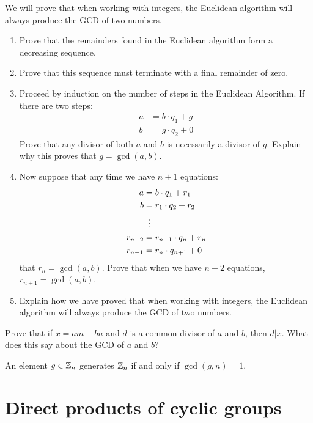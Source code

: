 \documentclass{ximera}
\begin{document}
\begin{exercise} 
We will prove that when working with integers, the Euclidean algorithm
will always produce the GCD of two numbers.
\begin{enumerate}
\item Prove that the remainders found in the Euclidean algorithm form a
  decreasing sequence.
\item Prove that this sequence must terminate with a final remainder
  of zero.
\item Proceed by induction on the number of steps in the Euclidean
  Algorithm. If there are two steps:
\begin{align*}
a &= b\cdot q_1 + g \\
b &= g\cdot q_2 +0
\end{align*}
Prove that any divisor of both $a$ and $b$ is necessarily a divisor
of $g$. Explain why this proves that $g = \gcd(a,b)$.
\item Now suppose that any time we have $n+1$ equations:
\begin{align*}
a &= b\cdot q_1 + r_1 \\
b &= r_1\cdot q_2 + r_2 \\
  &\hspace{.5em}\vdots\\
r_{n-2} &= r_{n-1}\cdot q_{n} + r_n\\
r_{n-1} &= r_{n}\cdot q_{n+1} + 0
\end{align*}
that $r_n = \gcd(a,b)$. Prove that when we have $n+2$ equations, $r_{n+1}
= \gcd(a,b)$.
\item Explain how we have proved that when working with integers, the
  Euclidean algorithm will always produce the GCD of two numbers.
\end{enumerate}
\end{exercise}


\begin{exercise} 
Prove that if $x = am +bn$ and $d$ is a common divisor of $a$ and $b$,
then $d|x$. What does this say about the GCD of $a$ and $b$?
\end{exercise}



\begin{corollary}
  An element $g\in \mathbb Z_n$ generates $\mathbb Z_n$ if and only if $\gcd(g,n) =
  1$.
\end{corollary}



\section{Direct products of cyclic groups}
\end{document}
